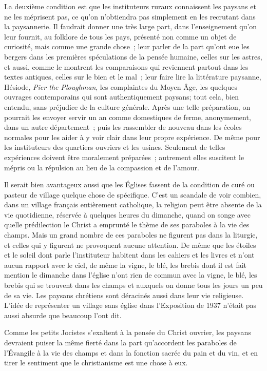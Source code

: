 \documentclass[french,twoside]{book} %
\begin{document}
La deuxième condition est que les instituteurs ruraux connaissent les paysans et ne les méprisent pas, ce qu'on n'obtiendra pas simplement en les recrutant dans la paysannerie. Il faudrait donner une très large part, dans l'enseignement qu'on leur fournit, au folklore de tous les pays, présenté non comme un objet de curiosité, mais comme une grande chose ; leur parler de la part qu'ont eue les bergers dans les premières spéculations de la pensée humaine, celles sur les astres, et aussi, comme le montrent les comparaisons qui reviennent partout dans les textes antiques, celles sur le bien et le mal ; leur faire lire la littérature paysanne, Hésiode, {\itshape Pier the Ploughman}, les complaintes du Moyen Âge, les quelques ouvrages contemporains qui sont authentiquement paysans; tout cela, bien entendu, sans préjudice de la culture générale. Après une telle préparation, on pourrait les envoyer servir un an comme domestiques de ferme, anonymement, dans un autre département ; puis les rassembler de nouveau dans les écoles normales pour les aider à y voir clair dans leur propre expérience. De même pour les instituteurs des quartiers ouvriers et les usines. Seulement de telles expériences doivent être moralement préparées ; autrement elles suscitent le mépris ou la répulsion au lieu de la compassion et de l'amour.\par
Il serait bien avantageux aussi que les Églises fassent de la condition de curé ou pasteur de village quelque chose de spécifique. C'est un scandale de voir combien, dans un village français entièrement catholique, la religion peut être absente de la vie quotidienne, réservée à quelques heures du dimanche, quand on songe avec quelle prédilection le Christ a emprunté le thème de ses paraboles à la vie des champs. Mais un grand nombre de ces paraboles ne figurent pas dans la liturgie, et celles qui y figurent ne provoquent aucune attention. De même que les étoiles et le soleil dont parle l'instituteur habitent dans les cahiers et les livres et n'ont aucun rapport avec le ciel, de même la vigne, le blé, les brebis dont il est fait mention le dimanche dans l'église n'ont rien de commun avec la vigne, le blé, les brebis qui se trouvent dans les champs et auxquels on donne tous les jours un peu de sa vie. Les paysans chrétiens sont déracinés aussi dans leur vie religieuse. L'idée de représenter un village sans église dans l’Exposition de 1937 n'était pas aussi absurde que beaucoup l'ont dit.\par
Comme les petits Jocistes s'exaltent à la pensée du Christ ouvrier, les paysans devraient puiser la même fierté dans la part qu'accordent les paraboles de l'Évangile à la vie des champs et dans la fonction sacrée du pain et du vin, et en tirer le sentiment que le christianisme est une chose à eux.\par
\end{document}
